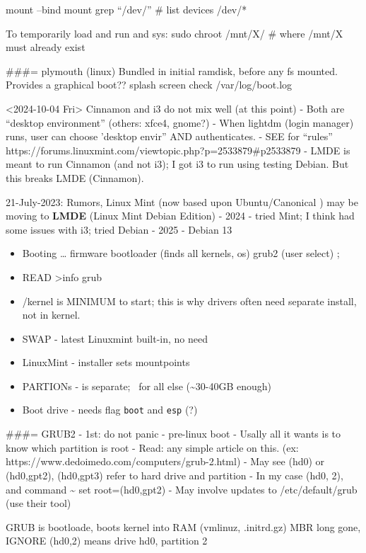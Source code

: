 \documentclass[
]{report}
\begin{document}
mount --bind mount \textbar{} grep ``/dev/'' \# list devices /dev/*

To temporarily load and run and sys: sudo chroot /mnt/X/ \# where /mnt/X
must already exist

\#\#\#= plymouth (linux) Bundled in initial ramdisk, before any fs
mounted. Provides a graphical boot?? splash screen check
/var/log/boot.log

\textless2024-10-04 Fri\textgreater{} Cinnamon and i3 do not mix well
(at this point) - Both are ``desktop environment'' (others: xfce4,
gnome?) - When lightdm (login manager) runs, user can choose 'desktop
envir'' AND authenticates. - SEE for ``rules''
https://forums.linuxmint.com/viewtopic.php?p=2533879\#p2533879 - LMDE is
meant to run Cinnamon (and not i3); I got i3 to run using testing
Debian. But this breaks LMDE (Cinnamon).

21-July-2023: Rumors, Linux Mint (now based upon Ubuntu/Canonical ) may
be moving to \textbf{LMDE} (Linux Mint Debian Edition) - 2024 - tried
Mint; I think had some issues with i3; tried Debian - 2025 - Debian 13

\begin{itemize}
\item
  Booting \ldots{} firmware \textbar{} bootloader (finds all kernels,
  os) \textbar{} grub2 (user select) ;\\
\item
  READ \textgreater info grub
\item
  /kernel is MINIMUM to start; this is why drivers often need separate
  install, not in kernel.
\item
  SWAP - latest Linuxmint built-in, no need
\item
  LinuxMint - installer sets mountpoints
\item
  PARTIONs - \home is separate; ~for all else (\textasciitilde30-40GB
  enough)
\item
  Boot drive - needs flag \texttt{boot} and \texttt{esp} (?)
\end{itemize}

\#\#\#= GRUB2 - 1st: do not panic - pre-linux boot - Usally all it wants
is to know which partition is root - Read: any simple article on this.
(ex: https://www.dedoimedo.com/computers/grub-2.html) - May see (hd0) or
(hd0,gpt2), (hd0,gpt3) refer to hard drive and partition - In my case
(hd0, 2), and command \textasciitilde{} set root=(hd0,gpt2) - May
involve updates to /etc/default/grub (use their tool)

GRUB is bootloade, boots kernel into RAM (vmlinuz, .initrd.gz) MBR long
gone, IGNORE (hd0,2) means drive hd0, partition 2
\end{document}
